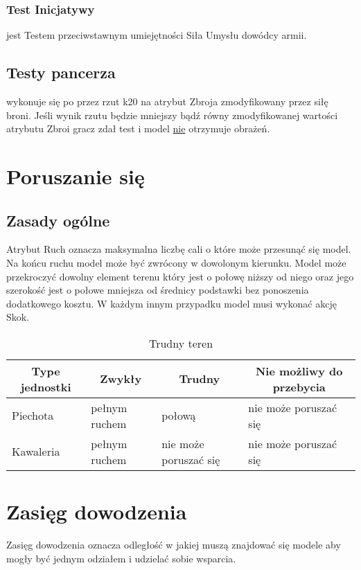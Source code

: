 \subsubsection{Test Inicjatywy} jest Testem przeciwstawnym umiejętności Siła Umysłu dowódcy armii. 

\subsection{Testy pancerza} wykonuje się po przez rzut k20 na atrybut Zbroja zmodyfikowany przez siłę broni. Jeśli wynik rzutu będzie mniejszy bądź równy zmodyfikowanej wartości atrybutu Zbroi gracz zdał test i model \underline{nie} otrzymuje obrażeń.


\section{Poruszanie się}
\subsection{Zasady ogólne}
Atrybut Ruch oznacza maksymalna liczbę cali o które może przesunąć się model. Na końcu ruchu model może być zwrócony w dowolonym kierunku. Model może przekroczyć dowolny element terenu który jest o połowę niższy od niego oraz jego szerokość jest o połowe mniejsza od średnicy podstawki bez ponoszenia dodatkowego kosztu. W każdym innym przypadku model musi wykonać akcję Skok. 

\begin{table}[h]
\caption{Trudny teren}
\begin{tabular}{|l|l|l|l|}
\hline
\multicolumn{1}{c}{Type jednostki} & \multicolumn{1}{c}{Zwykły} & \multicolumn{1}{c}{Trudny} & \multicolumn{1}{c}{Nie możliwy do przebycia} \\ \hline
Piechota & pełnym ruchem & połową & nie może poruszać się \\ \hline
Kawaleria & pełnym ruchem & nie może poruszać się & nie może poruszać się \\ \hline
\end{tabular}

\end{table}

\section{Zasięg dowodzenia}
Zasięg dowodzenia oznacza odległość w jakiej muszą znajdować się modele aby mogły być jednym odziałem i udzielać sobie wsparcia.
